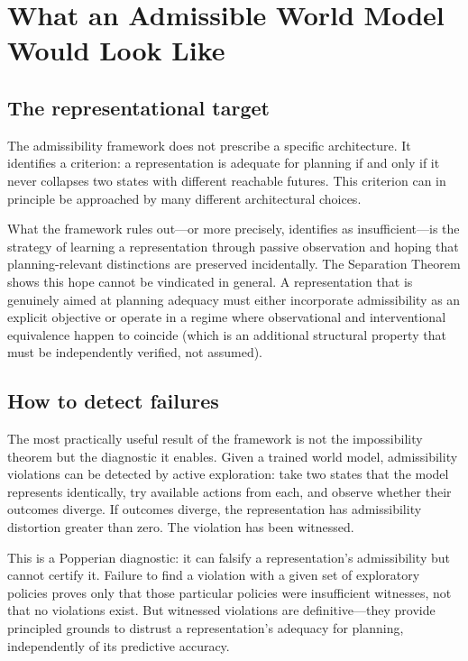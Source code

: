\documentclass[11pt,a4paper]{article}
\begin{document}
\section{What an Admissible World Model Would Look Like}

\subsection{The representational target}

The admissibility framework does not prescribe a specific architecture. It
identifies a criterion: a representation is adequate for planning if and only
if it never collapses two states with different reachable futures. This criterion
can in principle be approached by many different architectural choices.

What the framework rules out---or more precisely, identifies as insufficient---is
the strategy of learning a representation through passive observation and hoping
that planning-relevant distinctions are preserved incidentally. The Separation
Theorem shows this hope cannot be vindicated in general. A representation that
is genuinely aimed at planning adequacy must either incorporate admissibility
as an explicit objective or operate in a regime where observational and
interventional equivalence happen to coincide (which is an additional structural
property that must be independently verified, not assumed).

\subsection{How to detect failures}

The most practically useful result of the framework is not the impossibility
theorem but the diagnostic it enables. Given a trained world model, admissibility
violations can be detected by active exploration: take two states that the
model represents identically, try available actions from each, and observe
whether their outcomes diverge. If outcomes diverge, the representation has
admissibility distortion greater than zero. The violation has been witnessed.

This is a Popperian diagnostic: it can falsify a representation's admissibility
but cannot certify it. Failure to find a violation with a given set of exploratory
policies proves only that those particular policies were insufficient witnesses,
not that no violations exist. But witnessed violations are definitive---they
provide principled grounds to distrust a representation's adequacy for planning,
independently of its predictive accuracy.
\end{document}
